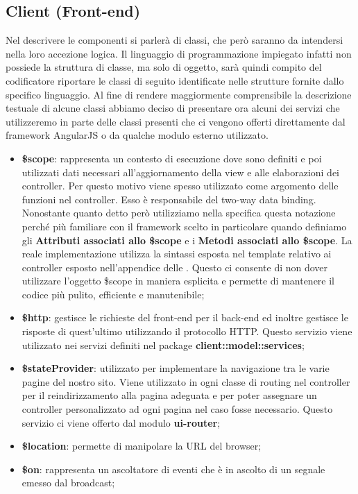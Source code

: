 \subsection{Client (Front-end)} %
\label{sub:client}
Nel descrivere le componenti si parlerà di classi, che però saranno da intendersi nella loro accezione logica. Il linguaggio di programmazione impiegato infatti non possiede la struttura di classe, ma solo di oggetto, sarà quindi compito del codificatore riportare le classi di seguito identificate nelle strutture fornite dallo specifico linguaggio. \newline
Al fine di rendere maggiormente comprensibile la descrizione testuale di alcune classi abbiamo deciso di presentare ora alcuni dei servizi che utilizzeremo in parte delle classi presenti che ci vengono offerti direttamente dal framework AngularJS o da qualche modulo esterno utilizzato.
	\begin{itemize}
		\item \textbf{\$scope}: rappresenta un contesto di esecuzione dove sono definiti e poi utilizzati dati necessari all'aggiornamento della view e alle elaborazioni dei controller. Per questo motivo viene spesso utilizzato come argomento delle funzioni nel controller. Esso è responsabile del two-way data binding. \newline
		Nonostante quanto detto però utilizziamo nella specifica questa notazione perché più familiare con il framework scelto in particolare quando definiamo gli \textbf{Attributi associati allo \$scope} e i \textbf{Metodi associati allo \$scope}. La reale implementazione utilizza la sintassi esposta nel template relativo ai controller esposto nell'appendice delle \docNameVersionNdP. Questo ci consente di non dover utilizzare l'oggetto \$scope in maniera esplicita e permette di mantenere il codice più pulito, efficiente e manutenibile;

		\item \textbf{\$http}: gestisce le richieste del front-end per il back-end ed inoltre gestisce le risposte di quest'ultimo utilizzando il protocollo HTTP. Questo servizio viene utilizzato nei servizi definiti nel package \textbf{client::model::services};
		\item \textbf{\$stateProvider}: utilizzato per implementare la navigazione tra le varie pagine del nostro sito. Viene utilizzato in ogni classe di routing nel controller per il reindirizzamento alla pagina adeguata e per poter assegnare un controller personalizzato ad ogni pagina nel caso fosse necessario. Questo servizio ci viene offerto dal modulo \textbf{ui-router};
		\item \textbf{\$location}: permette di manipolare la URL del browser;
		\item \textbf{\$on}: rappresenta un ascoltatore di eventi che è in ascolto di un segnale emesso dal broadcast;
	\end{itemize}

